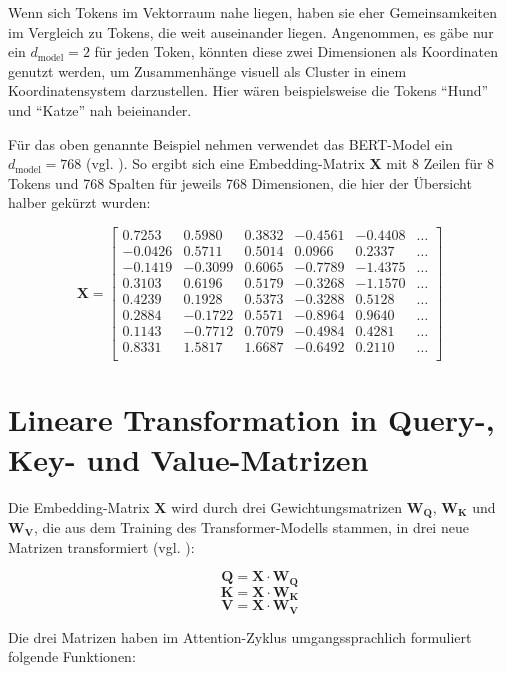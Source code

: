 Wenn sich Tokens im Vektorraum nahe liegen, haben sie eher Gemeinsamkeiten im Vergleich zu Tokens, die weit auseinander liegen.  
Angenommen, es gäbe nur ein \( d_{\text{model}} = 2 \) für jeden Token, könnten diese zwei Dimensionen als Koordinaten genutzt werden, um Zusammenhänge visuell als Cluster in einem Koordinatensystem darzustellen.  
Hier wären beispielsweise die Tokens \enquote{Hund} und \enquote{Katze} nah beieinander.

Für das oben genannte Beispiel nehmen verwendet das BERT-Model ein \( d_{\text{model}} = 768 \) (vgl. \cite[K. 3]{bert}).  
So ergibt sich eine Embedding-Matrix $\mathbf{X}$ mit 8 Zeilen für 8 Tokens und 768 Spalten für jeweils 768 Dimensionen, die hier der Übersicht halber gekürzt wurden:

\[
\mathbf{X} =
\begin{bmatrix}
0.7253 & 0.5980 & 0.3832 & -0.4561 & -0.4408 & \dots \\
-0.0426 & 0.5711 & 0.5014 & 0.0966 & 0.2337 & \dots \\
-0.1419 & -0.3099 & 0.6065 & -0.7789 & -1.4375 & \dots \\
0.3103 & 0.6196 & 0.5179 & -0.3268 & -1.1570 & \dots \\
0.4239 & 0.1928 & 0.5373 & -0.3288 & 0.5128 & \dots \\
0.2884 & -0.1722 & 0.5571 & -0.8964 & 0.9640 & \dots \\
0.1143 & -0.7712 & 0.7079 & -0.4984 & 0.4281 & \dots \\
0.8331 & 1.5817 & 1.6687 & -0.6492 & 0.2110 & \dots \\
\end{bmatrix}
\]

\section{Lineare Transformation in Query-, Key- und Value-Matrizen}

Die Embedding-Matrix $\mathbf{X}$ wird durch drei Gewichtungsmatrizen $\mathbf{W_Q}$, $\mathbf{W_K}$ und $\mathbf{W_V}$, die aus dem Training des Transformer-Modells stammen, in drei neue Matrizen transformiert (vgl. \cite[S. 209]{paass.2020}):

\[
\mathbf{Q} = \mathbf{X} \cdot \mathbf{W_Q}
\]
\[
\mathbf{K} = \mathbf{X} \cdot \mathbf{W_K}
\]
\[
\mathbf{V} = \mathbf{X} \cdot \mathbf{W_V}
\]

Die drei Matrizen haben im Attention-Zyklus umgangssprachlich formuliert folgende Funktionen:

